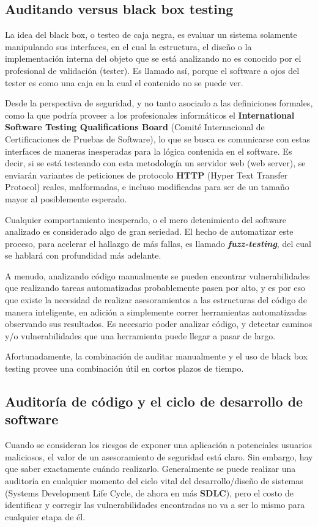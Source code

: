 \subsection{Auditando versus black box testing}
La idea del black box, o testeo de caja negra, es evaluar un sistema solamente manipulando sus interfaces, en el cual la estructura, el diseño o la implementación interna del objeto que se está analizando no es conocido por el profesional de validación (tester). Es llamado así, porque el software a ojos del tester es como una caja en la cual el contenido no se puede ver.

Desde la perspectiva de seguridad, y no tanto asociado a las definiciones formales, como la que podría proveer a los profesionales informáticos el \textbf{International Software Testing Qualifications Board} (Comité Internacional de Certificaciones de Pruebas de Software), lo que se busca es comunicarse con estas interfaces de maneras inesperadas para la lógica contenida en el software. Es decir, si se está testeando con esta metodología un servidor web (web server), se enviarán variantes de peticiones de protocolo \textbf{HTTP} (Hyper Text Transfer Protocol) reales, malformadas, e incluso modificadas para ser de un tamaño mayor al posiblemente esperado.

Cualquier comportamiento inesperado, o el mero detenimiento del software analizado es considerado algo de gran seriedad. El hecho de automatizar este proceso, para acelerar el hallazgo de más fallas, es llamado \textbf{\textit{fuzz-testing}}, del cual se hablará con profundidad más adelante.

A menudo, analizando código manualmente se pueden encontrar vulnerabilidades que realizando tareas automatizadas probablemente pasen por alto, y es por eso que existe la necesidad de realizar asesoramientos a las estructuras del código de manera inteligente, en adición a simplemente correr herramientas automatizadas observando sus resultados. Es necesario poder analizar código, y detectar caminos y/o vulnerabilidades que una herramienta puede llegar a pasar de largo.

Afortunadamente, la combinación de auditar manualmente y el uso de black box testing provee una combinación útil en cortos plazos de tiempo.
\subsection{Auditoría de código y el ciclo de desarrollo de software}
Cuando se consideran los riesgos de exponer una aplicación a potenciales usuarios maliciosos, el valor de un asesoramiento de seguridad está claro. Sin embargo, hay que saber exactamente cuándo realizarlo. Generalmente se puede realizar una auditoría en cualquier momento del ciclo vital del desarrollo/diseño de sistemas\cite{Highsmith2001AgileSD} (Systems Development Life Cycle, de ahora en más \textbf{SDLC}), pero el costo de identificar y corregir las vulnerabilidades encontradas no va a ser lo mismo para cualquier etapa de él. 


